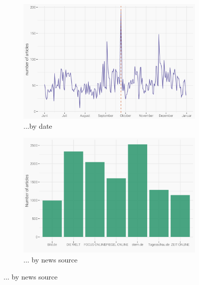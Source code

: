 \documentclass[12pt,a4paper,notitlepage]{article}
\begin{document}
\begin{figure}[H]
	\caption{Article distribution...}
	\begin{center}
		\begin{subfigure}[normla]{0.49\textwidth}
			\includegraphics[width=\textwidth]{../figs/timeline.png}
			\caption{...by date}
			\label{fig_distr1}
		\end{subfigure}
		\begin{subfigure}[normla]{0.49\textwidth}
			\includegraphics[width=\textwidth]{../figs/bar.png}
			\caption{... by news source}
			\label{fig_distr2}
		\end{subfigure}
	\end{center}
\end{figure}

\end{document}
